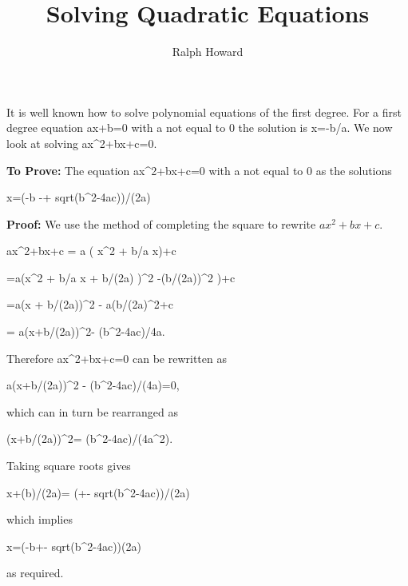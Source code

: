 \documentclass[11pt]{article}
\title{\LARGE \bf Solving Quadratic Equations}
\author{\Large  Ralph Howard}
\begin{document}
\maketitle 

It is well known how to solve polynomial equations of the first
degree. For a first degree equation ax+b=0 with a not equal to 0 the
solution is x=-b/a.  We now look at solving ax\^{}2+bx+c=0.


\textbf{To Prove:}
The equation ax\^{}2+bx+c=0 with a not equal to 0 as the solutions

x=(-b -+ sqrt(b\^{}2-4ac))/(2a)


\textbf{Proof:}
We use the method of completing the square to rewrite $ax^2+bx+c$.

ax\^{}2+bx+c = a ( x\^{}2 + b/a x)+c 

=a(x\^{}2 + b/a x + b/(2a) )\^{}2 -(b/(2a))\^{}2 )+c

=a(x + b/(2a))\^{}2 -  a(b/(2a)\^{}2+c

= a(x+b/(2a))\^{}2- (b\^{}2-4ac)/{4a}.

Therefore ax\^{}2+bx+c=0 can be rewritten as 

a(x+b/(2a))\^{}2 - (b\^{}2-4ac)/(4a)=0, 

which can in turn  be rearranged as

(x+b/(2a))\^{}2= (b\^{}2-4ac)/(4a\^{}2).

Taking square roots gives

x+(b)/(2a)= (+- sqrt(b\^{}2-4ac))/(2a)

which implies

x=(-b+- sqrt(b\^{}2-4ac))(2a)

as required.
\end{document}

